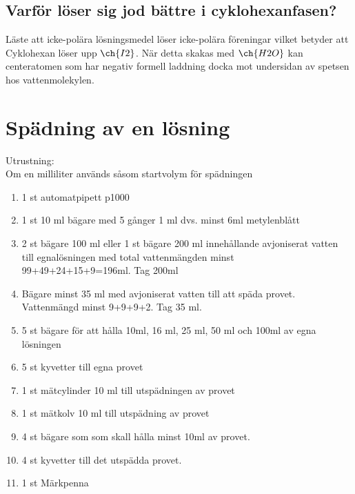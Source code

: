 \documentclass[./chem_exercises.tex]{subfiles}
\begin{document}
\subsection{Varför löser sig jod bättre i cyklohexanfasen?}

Läste att icke-polära lösningsmedel löser icke-polära föreningar vilket betyder att
Cyklohexan löser upp $\ch{I2}$. När detta skakas med $\ch{H2O}$ kan centeratomen som har negativ
formell laddning docka mot undersidan av spetsen hos vattenmolekylen.




\section{Spädning av en lösning}
Utrustning:\\
Om en milliliter används såsom startvolym för spädningen
\begin{enumerate}
\item 1 st automatpipett p1000\\
\item 1 st 10 ml bägare med 5 gånger 1 ml dvs. minst 6ml metylenblått\\
\item 2 st bägare 100 ml eller 1 st bägare 200 ml innehållande avjoniserat vatten
till egnalösningen med total vattenmängden minst\\
99+49+24+15+9=196ml. Tag 200ml

\item Bägare minst 35 ml med avjoniserat vatten till att späda provet.\\
Vattenmängd minst 9+9+9+2. Tag 35 ml.
\item 5 st bägare för att hålla 10ml, 16 ml, 25 ml, 50 ml och 100ml av egna lösningen
\item 5 st kyvetter till egna provet
\item 1 st mätcylinder 10 ml till utspädningen av provet
\item 1 st mätkolv 10 ml till utspädning av provet
\item 4 st bägare som som skall hålla minst 10ml av provet.
\item 4 st kyvetter till det utspädda provet.
\item 1 st Märkpenna
\end{enumerate}
\end{document}
